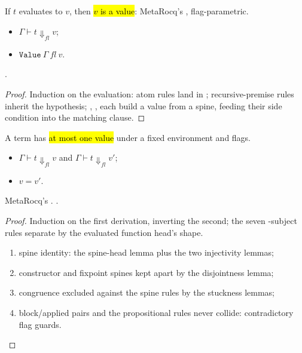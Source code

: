 \begin{theorem}
\label{thm:eval_to_value}
\leanok
{}
 If $t$ evaluates to $v$, then \hl{$v$ is a value}: MetaRocq's , flag-parametric.
\begin{itemize}
\item {} $\Gamma \vdash t \Downarrow_{fl} v$;
\item {} $\mathtt{Value}\ \Gamma\ fl\ v$.
\end{itemize}
 \stProved{}.
\end{theorem}
\begin{proof}
\leanok
{}
 Induction on the evaluation: atom rules land in ; recursive-premise rules inherit the hypothesis; , ,  each build a value from a spine, feeding their side condition into the matching  clause.
\end{proof}

\begin{theorem}[Determinism]
\label{thm:eval_deterministic}
\leanok
{}
 A \lbox{} term has \hl{at most one value} under a fixed environment and flags.
\begin{itemize}
\item {} $\Gamma \vdash t \Downarrow_{fl} v$ and $\Gamma \vdash t \Downarrow_{fl} v'$;
\item {} $v = v'$.
\end{itemize}
 MetaRocq's .
 \stProved{}.
\end{theorem}
\begin{proof}
\leanok
{}
 Induction on the first derivation, inverting the second; the seven -subject rules separate by the evaluated function head's shape.
\begin{enumerate}
\item spine identity: the spine-head lemma plus the two  injectivity lemmas;
\item constructor and fixpoint spines kept apart by the disjointness lemma;
\item congruence excluded against the spine rules by the stuckness lemmas;
\item block/applied pairs and the propositional rules never collide: contradictory flag guards.
\end{enumerate}
\end{proof}

